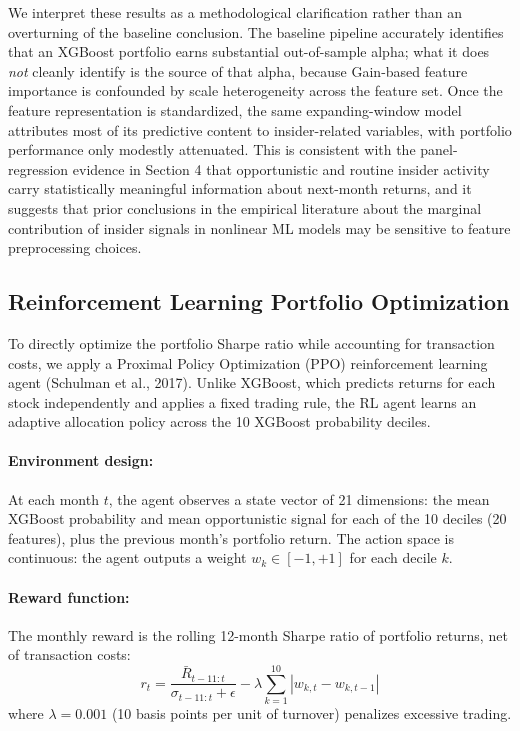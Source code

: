 \documentclass{article}
\begin{document}
We interpret these results as a methodological clarification rather than an overturning of the baseline conclusion. The baseline pipeline accurately identifies that an XGBoost portfolio earns substantial out-of-sample alpha; what it does \emph{not} cleanly identify is the source of that alpha, because Gain-based feature importance is confounded by scale heterogeneity across the feature set. Once the feature representation is standardized, the same expanding-window model attributes most of its predictive content to insider-related variables, with portfolio performance only modestly attenuated. This is consistent with the panel-regression evidence in Section 4 that opportunistic and routine insider activity carry statistically meaningful information about next-month returns, and it suggests that prior conclusions in the empirical literature about the marginal contribution of insider signals in nonlinear ML models may be sensitive to feature preprocessing choices.

\subsection{Reinforcement Learning Portfolio Optimization}

To directly optimize the portfolio Sharpe ratio while accounting for transaction costs, we apply a Proximal Policy Optimization (PPO) reinforcement learning agent (Schulman et al., 2017). Unlike XGBoost, which predicts returns for each stock independently and applies a fixed trading rule, the RL agent learns an adaptive allocation policy across the 10 XGBoost probability deciles.

\paragraph{Environment design:} At each month $t$, the agent observes a state vector of 21 dimensions: the mean XGBoost probability and mean opportunistic signal for each of the 10 deciles (20 features), plus the previous month's portfolio return. The action space is continuous: the agent outputs a weight $w_k \in [-1, +1]$ for each decile $k$.

\paragraph{Reward function:} The monthly reward is the rolling 12-month Sharpe ratio of portfolio returns, net of transaction costs:
\[
r_t = \frac{\bar{R}_{t-11:t}}{\sigma_{t-11:t} + \epsilon} - \lambda \sum_{k=1}^{10} |w_{k,t} - w_{k,t-1}|
\]
where $\lambda = 0.001$ (10 basis points per unit of turnover) penalizes excessive trading.
\end{document}
